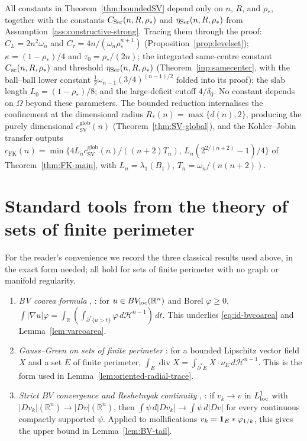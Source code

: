 \documentclass[11pt]{amsart}
\theoremstyle{definition}
\newcommand{\R}{\mathbb R}
\newcommand{\Om}{\Omega}
\newcommand{\rstar}{\rho_*}
\newcommand{\Hn}{\mathcal H^{n-1}}
\begin{document}
\noindent
All constants in Theorem~\ref{thm:boundedSV} depend only on \(n\), \(R\), and
\(\rstar\), together with the constants \(C_{\rm Ser}(n,R,\rstar)\) and
\(\eta_{\rm Ser}(n,R,\rstar)\) from Assumption~\ref{ass:constructive-strong}.
Tracing them through the proof: \(C_L=2n^2\omega_n\) and
\(C_\tau=4n/(\omega_n\rstar^{n+1})\) (Proposition~\ref{prop:levelset});
\(\kappa=(1-\rstar)/4\) and \(\tau_0=\rstar/(2n)\); the integrated same-centre
constant \(C_{\rm sc}(n,R,\rstar)\) and threshold \(\eta_{\rm Ser}(n,R,\rstar)\)
(Theorem~\ref{inp:samecenter}, with the ball--ball
lower constant \(\tfrac12\omega_{n-1}(3/4)^{(n-1)/2}\) folded into its proof);
the slab length
\(L_0=(1-\rstar)/8\); and the large-deficit cutoff \(4/\delta_0\).  No constant
depends on \(\Om\) beyond these parameters.  The bounded reduction internalises
the confinement at the dimensional radius \(R_*(n)=\max\{d(n),2\}\), producing
the purely dimensional \(c_{\mathrm{SV}}^{\mathrm{glob}}(n)\)
(Theorem~\ref{thm:SV-global}), and the Kohler--Jobin transfer outputs
\(c_{\mathrm{FK}}(n)=\min\{4L_n c_{\mathrm{SV}}^{\mathrm{glob}}(n)/((n+2)T_n),\,
L_n(2^{2/(n+2)}-1)/4\}\) of Theorem~\ref{thm:FK-main}, with
\(L_n=\lambda_1(B_1)\), \(T_n=\omega_n/(n(n+2))\).

\appendix

\section{Standard tools from the theory of sets of finite perimeter}
\label{app:bv}

For the reader's convenience we record the three classical results used above,
in the exact form needed; all hold for sets of finite perimeter with no graph
or manifold regularity.

\begin{enumerate}[leftmargin=2em]
\item \emph{BV coarea formula} \cite[Thm.~13.1]{Maggi2012},
\cite[Thm.~3.40]{AFP2000}: for \(u\in BV_{\rm loc}(\R^n)\) and Borel
\(\varphi\ge0\),
\(\int|\nabla u|\varphi=\int_{\R}(\int_{\partial^*\{u>t\}}\varphi\,d\Hn)\,dt\).
This underlies \eqref{eq:id-bvcoarea} and Lemma~\ref{lem:varcoarea}.
\item \emph{Gauss--Green on sets of finite perimeter}
\cite[Ch.~17]{Maggi2012}: for a bounded Lipschitz vector field \(X\) and a set
\(E\) of finite perimeter,
\(\int_E\operatorname{div}X=\int_{\partial^*E}X\cdot\nu_E\,d\Hn\).  This is the
form used in Lemma~\ref{lem:oriented-radial-trace}.
\item \emph{Strict \(BV\) convergence and Reshetnyak continuity}
\cite[Thm.~2.39]{AFP2000}, \cite[Ch.~20]{Maggi2012}: if
\(v_k\to v\) in \(L^1_{\rm loc}\) with \(|Dv_k|(\R^n)\to|Dv|(\R^n)\), then
\(\int\psi\,d|Dv_k|\to\int\psi\,d|Dv|\) for every continuous compactly
supported \(\psi\).  Applied to mollifications \(v_k={\bf1}_E*\varphi_{1/k}\),
this gives the upper bound in Lemma~\ref{lem:BV-tail}.
\end{enumerate}
\end{document}

